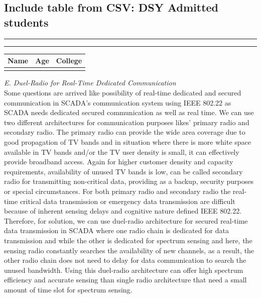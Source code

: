 \documentclass[conference]{IEEEtran}
\begin{document}
\begin{Summary - }
\section{Include table from CSV:
 DSY Admitted students}
 
\hrule 
 
 \hrule
 
 \newline
 
				\begin{Center}
					
			
				\begin{tabular}{|c|c|c|}%
					\hline
					\bfseries Name & \bfseries Age & \bfseries College
					\csvreader[head to column names]{Book1.csv}{}
					{\\\hline\csvcoli&\csvcolii&\csvcoliii}\\
					\hline
				\end{tabular}	
				\end{Center}	

\vspace{1cm}

\vspace{0.2cm}\emph{E. \hspace{0.3cm}Duel-Radio for Real-Time Dedicated Communication}\\
Some questions are arrived like possibility of real-time
dedicated and secured communication in SCADA’s
communication system using IEEE 802.22 as SCADA needs
dedicated secured communication as well as real time. We can
use two different architectures for communication purposes
likes’ primary radio and secondary radio. The primary radio
can provide the wide area coverage due to good propagation of
TV bands and in situation where there is more white space
available in TV bands and/or the TV user density is small, it
can effectively provide broadband access. Again for higher
customer density and capacity requirements, availability of
unused TV bands is low, can be called secondary radio for
transmitting non-critical data, providing as a backup, security
purposes or special circumstances. For both primary radio and
secondary radio the real-time critical data transmission or
emergency data transmission are difficult because of inherent
sensing delays and cognitive nature defined IEEE 802.22.
Therefore, for solution, we can use duel-radio architecture for
secured real-time data transmission in SCADA where one radio
chain is dedicated for data transmission and while the other is
dedicated for spectrum sensing and here, the sensing radio
constantly searches the availability of new channels, as a result,
the other radio chain does not need to delay for data
communication to search the unused bandwidth. Using this
duel-radio architecture can offer high spectrum efficiency and
accurate sensing than single radio architecture that need a small
amount of time slot for spectrum sensing.


\end{Summary - }
\end{document}
